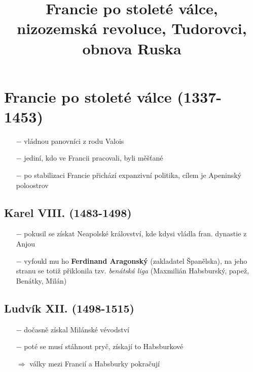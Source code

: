 \documentclass{article}
\title{\vspace{-2cm}Francie po stoleté válce, nizozemská revoluce, Tudorovci, obnova Ruska\vspace{-1.7cm}}
\date{}
\author{}
\begin{document}
\maketitle


\section*{Francie po stoleté válce (1337-1453)}
\begin{itemize}
    \vspace{-0.5em}
    \setlength\itemsep{0.15em}
    \item[$-$] vládnou panovníci z rodu Valois
    \item[$-$] jediní, kdo ve Francii pracovali, byli měšťané
    \item[$-$] po stabilizaci Francie přichází expanzivní politika, cílem je Apeninský poloostrov
\end{itemize}

\subsection*{Karel VIII. (1483-1498)}
\begin{itemize}
    \vspace{-0.5em}
    \setlength\itemsep{0.15em}
    \item[$-$] pokusil se získat Neapolské království, kde kdysi vládla fran. dynastie z Anjou
    \item[$-$] vyfoukl mu ho \textbf{Ferdinand Aragonský} (zakladatel Španělska), na jeho stranu se totiž přiklonila tzv. \textit{benátská liga} (Maxmilián Habsburský, papež, Benátky, Milán)
\end{itemize}

\subsection*{Ludvík XII. (1498-1515)}
\begin{itemize}
    \vspace{-0.5em}
    \setlength\itemsep{0.15em}
    \item[$-$] dočasně získal Milánské vévodství
    \item[$-$] poté se musí stáhnout pryč, získají to Habsburkové
    \item[$\Rightarrow$] války mezi Francií a Habsburky pokračují
\end{itemize}
\end{document}
